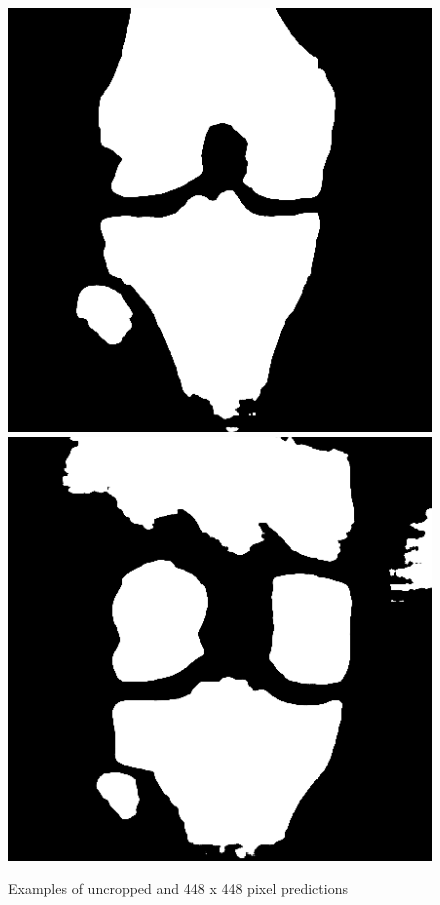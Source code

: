 \begin{figure}[H]
\endminipage\hfill
{}%
  \includegraphics[width=\linewidth]{imgs/transfer_size_y3.png}
\endminipage\hfill
{}%
  \includegraphics[width=\linewidth]{imgs/transfer_size_y4.png}
\endminipage
\caption{Examples of uncropped and 448 x 448 pixel predictions}
\end{figure}

